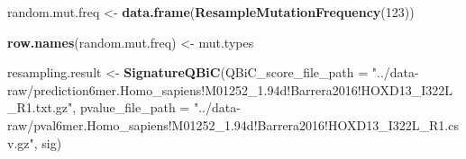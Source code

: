 \documentclass[
]{article}
\newenvironment{Shaded}{\begin{snugshade}}{\end{snugshade}}
\newcommand{\DataTypeTok}[1]{\textcolor[rgb]{0.13,0.29,0.53}{#1}}
\newcommand{\DecValTok}[1]{\textcolor[rgb]{0.00,0.00,0.81}{#1}}
\newcommand{\KeywordTok}[1]{\textcolor[rgb]{0.13,0.29,0.53}{\textbf{#1}}}
\newcommand{\NormalTok}[1]{#1}
\newcommand{\StringTok}[1]{\textcolor[rgb]{0.31,0.60,0.02}{#1}}
\begin{document}
\begin{Shaded}
\begin{Highlighting}[]
\NormalTok{random.mut.freq <-}\StringTok{ }\KeywordTok{data.frame}\NormalTok{(}\KeywordTok{ResampleMutationFrequency}\NormalTok{(}\DecValTok{123}\NormalTok{))}

\KeywordTok{row.names}\NormalTok{(random.mut.freq) <-}\StringTok{ }\NormalTok{mut.types}

\NormalTok{resampling.result <-}\StringTok{ }
\StringTok{  }\KeywordTok{SignatureQBiC}\NormalTok{(}\DataTypeTok{QBiC_score_file_path =}
                  \StringTok{"../data-raw/prediction6mer.Homo_sapiens!M01252_1.94d!Barrera2016!HOXD13_I322L_R1.txt.gz"}\NormalTok{,}
                \DataTypeTok{pvalue_file_path =} 
                  \StringTok{"../data-raw/pval6mer.Homo_sapiens!M01252_1.94d!Barrera2016!HOXD13_I322L_R1.csv.gz"}\NormalTok{,}
\NormalTok{                sig) }
\end{Highlighting}
\end{Shaded}
\end{document}
